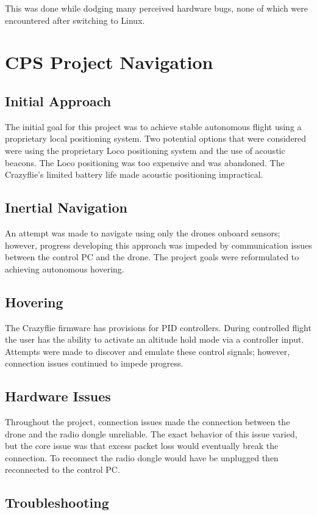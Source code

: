\documentclass[12pt]{article}
\begin{document}
This was done while dodging many perceived hardware bugs, none of which were encountered after switching to Linux.

\section{CPS Project Navigation}
\subsection{Initial Approach}
The initial goal for this project was to achieve stable autonomous flight using a proprietary local positioning system. Two potential options that were considered were using the proprietary Loco positioning system and the use of acoustic beacons. The Loco positioning was too expensive and was abandoned. The Crazyflie’s limited battery life made acoustic positioning impractical.
\subsection{Inertial Navigation}
An attempt was made to navigate using only the drones onboard sensors; however, progress developing this approach was impeded by communication issues between the control PC and the drone. The project goals were reformulated to achieving autonomous hovering.
\subsection{Hovering}
The Crazyflie firmware has provisions for PID controllers. During controlled flight the user has the ability to activate an altitude hold mode via a controller input. Attempts were made to discover and emulate these control signals; however, connection issues continued to impede progress.
\subsection{Hardware Issues}
Throughout the project, connection issues made the connection between the drone and the radio dongle unreliable. The exact behavior of this issue varied, but the core issue was that excess packet loss would eventually break the connection. To reconnect the radio dongle would have be unplugged then reconnected to the control PC.
\subsection{Troubleshooting}
\end{document}

